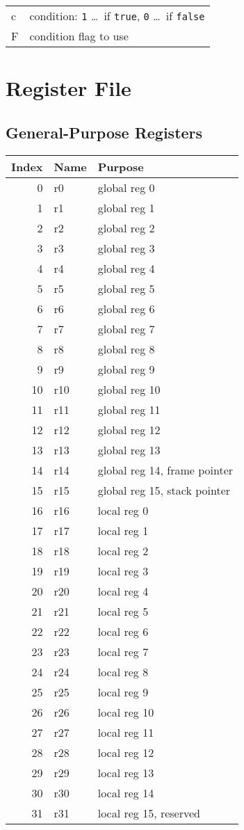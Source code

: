 \documentclass[10pt,DIV12]{scrartcl}
\begin{document}
\medskip

\noindent
\begin{tabular}{l@{ \ldots\ }l}
  c & condition: \texttt{1} \ldots\ if \texttt{true}, \texttt{0} \ldots\ if \texttt{false} \\
  F & condition flag to use \\
\end{tabular}

\section{Register File}

\subsection{General-Purpose Registers}

\begin{tabular}{rll}
\toprule
Index & Name & Purpose \\
\midrule
0 & r0 & global reg 0 \\
1 & r1 & global reg 1 \\
2 & r2 & global reg 2 \\
3 & r3 & global reg 3 \\
4 & r4 & global reg 4 \\
5 & r5 & global reg 5 \\
6 & r6 & global reg 6 \\
7 & r7 & global reg 7 \\
8 & r8 & global reg 8 \\
9 & r9 & global reg 9 \\
10 & r10 & global reg 10 \\
11 & r11 & global reg 11 \\
12 & r12 & global reg 12 \\
13 & r13 & global reg 13 \\
14 & r14 & global reg 14, frame pointer \\
15 & r15 & global reg 15, stack pointer \\
\cmidrule{1-3}
16 & r16 & local reg 0 \\
17 & r17 & local reg 1 \\
18 & r18 & local reg 2 \\
19 & r19 & local reg 3 \\
20 & r20 & local reg 4 \\
21 & r21 & local reg 5 \\
22 & r22 & local reg 6 \\
23 & r23 & local reg 7 \\
24 & r24 & local reg 8 \\
25 & r25 & local reg 9 \\
26 & r26 & local reg 10 \\
27 & r27 & local reg 11 \\
28 & r28 & local reg 12 \\
29 & r29 & local reg 13 \\
30 & r30 & local reg 14 \\
31 & r31 & local reg 15, reserved \\
\bottomrule 
\end{tabular}
\end{document}
